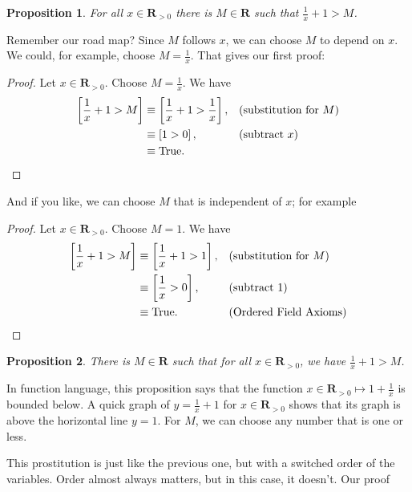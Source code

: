 \documentclass[12pt,fleqn]{article}
\newcommand{\reals}{\mathbf{R}}
\newcommand{\true}{\mathrm{True}}
\newenvironment{myproof}
  {\begin{shaded}\begin{proof}}
  {\end{proof}\end{shaded}}
\newtheorem{prop}{Proposition}
\begin{document}
   


       
    \begin{prop} For all $x \in \reals_{>0}$ there is $M \in \reals$ such
     that $\frac{1}{x} +1 > M$. 
    \end{prop}
    \noindent Remember our road map? Since $M$ follows $x$, we can choose $M$ to depend on $x$. We could, for example, 
    choose $M = \frac{1}{x}$. That gives our first proof:
         \begin{myproof} 
      Let $x \in \reals_{>0}$. Choose $M = \frac{1}{x}$. We have
          \begin{align*}
          \left[\frac{1}{x}+1>M \right] &\equiv \left[\frac{1}{x}+1> \frac{1}{x} \right], &&\text{(substitution for $M$)} \\
                                  &\equiv \left [1 >0 \right], && \text{(subtract $x$)} \\
                                  &\equiv \true.   \qedhere
      \end{align*}
\end{myproof}
\noindent And if you like, we can choose $M$ that is independent of $x$; for example    
    \begin{myproof} 
      Let $x \in \reals_{>0}$. Choose $M = 1$. We have
          \begin{align*}
          \left[\frac{1}{x}+1>M \right] &\equiv \left[\frac{1}{x}+1>1\right], &&\text{(substitution for $M$)} \\
                                  &\equiv \left [\frac{1}{x}>0 \right],
                                  &&\text {(subtract 1)}\\
                                  &\equiv \true. &&\text {(Ordered Field Axioms)} \qedhere
      \end{align*}
\end{myproof}

    \begin{prop}
      There is $M \in \reals$ such that for all $x \in \reals_{>0}$,
     we have $\frac{1}{x} + 1 > M$. 
    \end{prop}
    \noindent In function language, this proposition  says that the function $x \in \reals_{>0} \mapsto 1+\frac{1}{x}$ is bounded below.
        A quick graph of $ y = \frac{1}{x} + 1 $ for  $x \in \reals_{>0}$ shows that its graph is above the horizontal line $y = 1$. For $M$, 
    we can choose any number that is one or less.
    
    This prostitution is just like the previous one, but with a switched order of the variables.  Order almost always matters, but in this case, it 
    doesn't. Our proof
    
\end{document}
